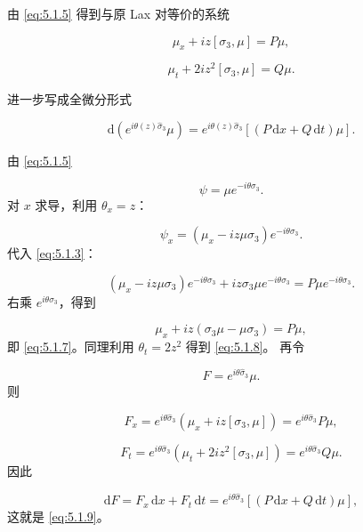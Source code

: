 \documentclass[
    lang=cn,
    scheme=chinese,
    mode=simple,
    device=normal,
    color=blue,
    math=cm,
    thmcnt=section,
    12pt
]{elegantbook}
\begin{document}
由 \eqref{eq:5.1.5} 得到与原 Lax 对等价的系统

\begin{equation}
    \mu_x+iz[\sigma_3,\mu]=P\mu,
    \tag{5.1.7}
    \label{eq:5.1.7}
\end{equation}

\begin{equation}
    \mu_t+2iz^2[\sigma_3,\mu]=Q\mu.
    \tag{5.1.8}
    \label{eq:5.1.8}
\end{equation}

进一步写成全微分形式

\begin{equation}
    \mathrm d\!\left(e^{i\theta(z)\widehat{\sigma}_3}\mu\right)
    =
    e^{i\theta(z)\widehat{\sigma}_3}
    \left[(P\,\mathrm dx+Q\,\mathrm dt)\mu\right].
    \tag{5.1.9}
    \label{eq:5.1.9}
\end{equation}

\begin{callout}
    由 \eqref{eq:5.1.5}

    \[
        \psi=\mu e^{-i\theta\sigma_3}.
    \]
    对 $x$ 求导，利用 $\theta_x=z$：

    \[
        \psi_x
        =
        \left(
        \mu_x-iz\mu\sigma_3
        \right)e^{-i\theta\sigma_3}.
    \]
    代入 \eqref{eq:5.1.3}：

    \[
        \left(
        \mu_x-iz\mu\sigma_3
        \right)e^{-i\theta\sigma_3}
        +
        iz\sigma_3\mu e^{-i\theta\sigma_3}
        =
        P\mu e^{-i\theta\sigma_3}.
    \]
    右乘 $e^{i\theta\sigma_3}$，得到

    \[
        \mu_x+iz(\sigma_3\mu-\mu\sigma_3)=P\mu,
    \]
    即 \eqref{eq:5.1.7}。同理利用 $\theta_t=2z^2$ 得到 \eqref{eq:5.1.8}。
    再令

    \[
        F=e^{i\theta\widehat{\sigma}_3}\mu.
    \]
    则

    \[
        F_x
        =
        e^{i\theta\widehat{\sigma}_3}
        \left(
        \mu_x+iz[\sigma_3,\mu]
        \right)
        =
        e^{i\theta\widehat{\sigma}_3}P\mu,
    \]

    \[
        F_t
        =
        e^{i\theta\widehat{\sigma}_3}
        \left(
        \mu_t+2iz^2[\sigma_3,\mu]
        \right)
        =
        e^{i\theta\widehat{\sigma}_3}Q\mu.
    \]
    因此

    \[
        \mathrm dF
        =
        F_x\,\mathrm dx+F_t\,\mathrm dt
        =
        e^{i\theta\widehat{\sigma}_3}
        \left[(P\,\mathrm dx+Q\,\mathrm dt)\mu\right],
    \]
    这就是 \eqref{eq:5.1.9}。
\end{callout}
\end{document}
